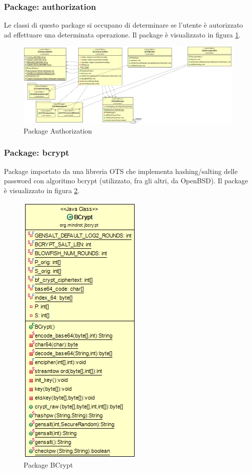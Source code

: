 \subsubsection{Package: \textbf{authorization}}

Le classi di questo package si occupano di determinare se l’utente è autorizzato ad effettuare una determinata operazione. Il package è visualizzato in figura \ref{gfx:dependencies_authorization}.


\begin{figure}[!htbp]
	\centering
	\includegraphics[scale = .3]{img/dependencies_authorization}
	\caption{Package Authorization}
	\label{gfx:dependencies_authorization}
\end{figure}

\subsubsection{Package: \textbf{bcrypt}}

Package importato da una libreria OTS che implementa hashing/salting delle password con algoritmo bcrypt (utilizzato, fra gli altri, da OpenBSD). 
Il package è visualizzato in figura \ref{gfx:dependencies_bcrypt}.

\begin{figure}[!htbp]
	\centering
	\includegraphics[scale = .5]{img/dependencies_bcrypt}
	\caption{Package BCrypt}
	\label{gfx:dependencies_bcrypt}
\end{figure}

